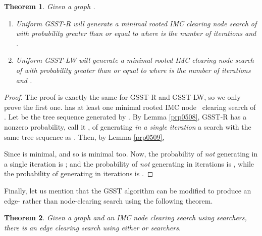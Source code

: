 \documentclass[11pt]{article}\usepackage{amsmath}
\newtheorem{theorem}{Theorem}[section]
\begin{document}
\begin{theorem}
\label{prp0510}Given a graph .

\begin{enumerate}
\item Uniform GSST-R will generate a minimal rooted IMC clearing node search
of  with probability greater than or equal to 
where  is the number of iterations and .

\item Uniform GSST-LW will generate a minimal rooted IMC clearing node search
of  with probability greater than or equal to 
where  is the number of iterations and .
\end{enumerate}
\end{theorem}

\begin{proof}
The proof is exactly the same for GSST-R and GSST-LW, so we only prove the
first one.  has at least one minimal rooted IMC node \ clearing
search  of . Let  be the tree sequence generated by
. By Lemma \ref{prp0508}, GSST-R has a nonzero probability, call
it , of generating \emph{in a single iteration} a search
 with the same tree sequence as . Then, by
Lemma \ref{prp0509},

Since  is minimal,  and so  is minimal too. Now, the probability of \emph{not} generating
 in a single iteration is ; and
the probability of \emph{not} generating  in 
iterations is , while the
probability of generating  in  iterations is
.
\end{proof}

Finally, let us mention that the GSST algorithm can be modified to produce an
edge- rather than node-clearing search using the following theorem.

\begin{center}



\end{center}

\begin{theorem}
\label{prp0511}Given a graph  and an IMC node clearing search
 using  searchers, there is an edge clearing search
 using either  or  searchers.
\end{theorem}
\end{document}
